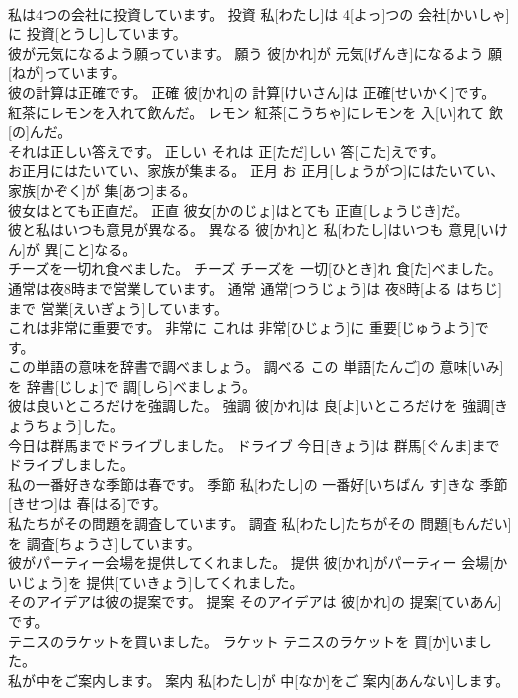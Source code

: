 \documentclass[8pt]{extreport}
\begin{document}
\begin{CJK}{UTF8}{min}
\\	私は4つの会社に投資しています。	投資	私[わたし]は 4[よっ]つの 会社[かいしゃ]に 投資[とうし]しています。	
\\	彼が元気になるよう願っています。	願う	彼[かれ]が 元気[げんき]になるよう 願[ねが]っています。	
\\	彼の計算は正確です。	正確	彼[かれ]の 計算[けいさん]は 正確[せいかく]です。	
\\	紅茶にレモンを入れて飲んだ。	レモン	紅茶[こうちゃ]にレモンを 入[い]れて 飲[の]んだ。	
\\	それは正しい答えです。	正しい	それは 正[ただ]しい 答[こた]えです。	
\\	お正月にはたいてい、家族が集まる。	正月	お 正月[しょうがつ]にはたいてい、 家族[かぞく]が 集[あつ]まる。	
\\	彼女はとても正直だ。	正直	彼女[かのじょ]はとても 正直[しょうじき]だ。	
\\	彼と私はいつも意見が異なる。	異なる	彼[かれ]と 私[わたし]はいつも 意見[いけん]が 異[こと]なる。	
\\	チーズを一切れ食べました。	チーズ	チーズを 一切[ひとき]れ 食[た]べました。	
\\	通常は夜8時まで営業しています。	通常	通常[つうじょう]は 夜8時[よる はちじ]まで 営業[えいぎょう]しています。	
\\	これは非常に重要です。	非常に	これは 非常[ひじょう]に 重要[じゅうよう]です。	
\\	この単語の意味を辞書で調べましょう。	調べる	この 単語[たんご]の 意味[いみ]を 辞書[じしょ]で 調[しら]べましょう。	
\\	彼は良いところだけを強調した。	強調	彼[かれ]は 良[よ]いところだけを 強調[きょうちょう]した。	
\\	今日は群馬までドライブしました。	ドライブ	今日[きょう]は 群馬[ぐんま]までドライブしました。	
\\	私の一番好きな季節は春です。	季節	私[わたし]の 一番好[いちばん す]きな 季節[きせつ]は 春[はる]です。	
\\	私たちがその問題を調査しています。	調査	私[わたし]たちがその 問題[もんだい]を 調査[ちょうさ]しています。	
\\	彼がパーティー会場を提供してくれました。	提供	彼[かれ]がパーティー 会場[かいじょう]を 提供[ていきょう]してくれました。	
\\	そのアイデアは彼の提案です。	提案	そのアイデアは 彼[かれ]の 提案[ていあん]です。	
\\	テニスのラケットを買いました。	ラケット	テニスのラケットを 買[か]いました。	
\\	私が中をご案内します。	案内	私[わたし]が 中[なか]をご 案内[あんない]します。	

\end{CJK}
\end{document}
